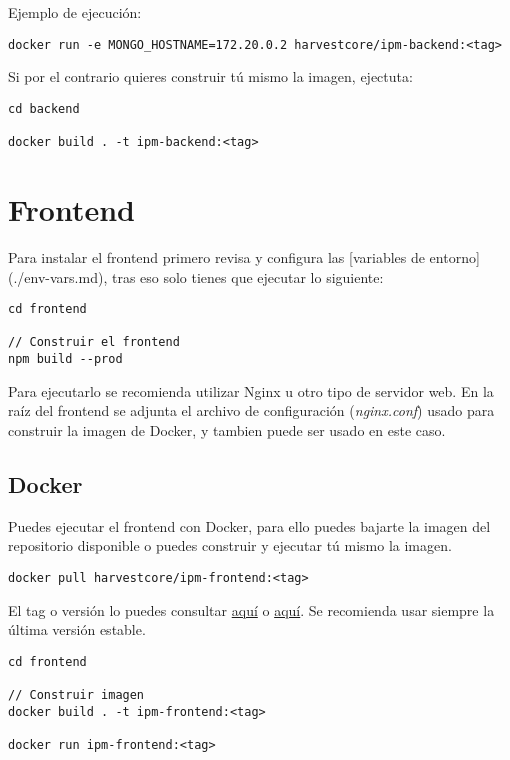 Ejemplo de ejecución:

\begin{lstlisting}
docker run -e MONGO_HOSTNAME=172.20.0.2 harvestcore/ipm-backend:<tag>
\end{lstlisting}

Si por el contrario quieres construir tú mismo la imagen, ejectuta:

\begin{lstlisting}
cd backend

docker build . -t ipm-backend:<tag>
\end{lstlisting}





\section{Frontend}

Para instalar el frontend primero revisa y configura las [variables de entorno](./env-vars.md), tras eso solo tienes que ejecutar lo siguiente:

\begin{lstlisting}
cd frontend

// Construir el frontend
npm build --prod
\end{lstlisting}

Para ejecutarlo se recomienda utilizar Nginx u otro tipo de servidor web. En la raíz del frontend se adjunta el archivo de configuración (\textit{nginx.conf}) usado para construir la imagen de Docker, y tambien puede ser usado en este caso.



\subsection{Docker}

Puedes ejecutar el frontend con Docker, para ello puedes bajarte la imagen del repositorio disponible o puedes construir y ejecutar tú mismo la imagen.

\begin{lstlisting}
docker pull harvestcore/ipm-frontend:<tag>
\end{lstlisting}

El tag o versión lo puedes consultar \href{https://github.com/harvestcore/tfg/releases}{aquí} o \href{https://hub.docker.com/r/harvestcore/ipm-frontend/tags}{aquí}. Se recomienda usar siempre la última versión estable.

\begin{lstlisting}
cd frontend

// Construir imagen
docker build . -t ipm-frontend:<tag>

docker run ipm-frontend:<tag>
\end{lstlisting}



